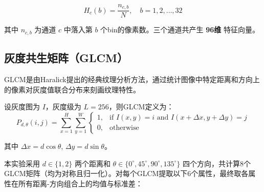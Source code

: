 \documentclass[12pt,a4paper]{ctexart}
\begin{document}
\begin{equation}
    H_c(b) = \frac{n_{c,b}}{N}, \quad b = 1, 2, \ldots, 32
\end{equation}

其中 $n_{c,b}$ 为通道 $c$ 中落入第 $b$ 个bin的像素数。三个通道共产生 \textbf{96维} 特征向量。

\subsection{灰度共生矩阵（GLCM）}

GLCM是由Haralick提出的经典纹理分析方法，通过统计图像中特定距离和方向上的像素对灰度值联合分布来刻画纹理特性。

设灰度图为 $I$，灰度级为 $L=256$，则GLCM定义为：
\begin{equation}
    P_{d,\theta}(i,j) = \sum_{x=1}^{H}\sum_{y=1}^{W} \begin{cases}
        1, & \text{if } I(x,y)=i \text{ and } I(x+\Delta x, y+\Delta y)=j \\
        0, & \text{otherwise}
    \end{cases}
\end{equation}

其中 $\Delta x = d\cos\theta$, $\Delta y = d\sin\theta$。

本实验采用 $d \in \{1, 2\}$ 两个距离和 $\theta \in \{0^\circ, 45^\circ, 90^\circ, 135^\circ\}$ 四个方向，共计算8个GLCM矩阵（均为对称且归一化）。对每个GLCM提取以下6个属性，最终取各属性在所有距离-方向组合上的均值与标准差：
\end{document}

